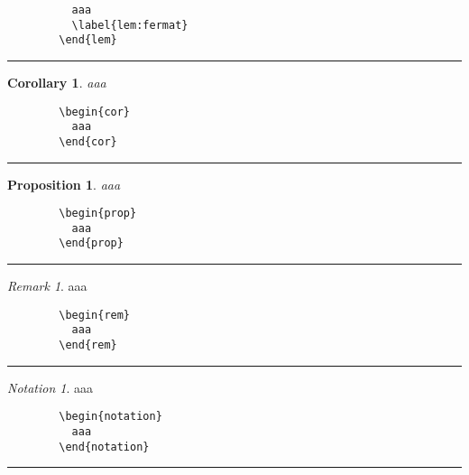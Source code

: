 \documentclass[a4paper,10pt,landscape]{article}
\makeatletter
\newcommand{\hSep}{{\color{colorSep}\hrule}}
\newtheorem{cor}[thm]{Corollary}
\newtheorem{prop}[thm]{Proposition}
\theoremstyle{definition}
\theoremstyle{remark}
\newtheorem{rem}{Remark}[section]
\newtheorem*{notation}{Notation}
\newtheorem{exmp}{Example}[section] %
\makeatother
\begin{document}
\begin{multicols}{3}
\begin{multicols}{2}
\begin{verbatim}
		  aaa
		  \label{lem:fermat}
		\end{lem}
	\end{verbatim}
\end{multicols}
\hSep
\begin{multicols}{2}
		\begin{cor}
		  aaa
		\end{cor}
\columnbreak
	\begin{verbatim}
		\begin{cor}
		  aaa
		\end{cor}
	\end{verbatim}
\end{multicols}
\hSep
\begin{multicols}{2}
		\begin{prop}
		  aaa
		\end{prop}
\columnbreak
	\begin{verbatim}
		\begin{prop}
		  aaa
		\end{prop}
	\end{verbatim}
\end{multicols}
\hSep
\begin{multicols}{2}
		\begin{rem}
		  aaa
		\end{rem}
\columnbreak
	\begin{verbatim}
		\begin{rem}
		  aaa
		\end{rem}
	\end{verbatim}
\end{multicols}
\hSep
\begin{multicols}{2}
		\begin{notation}
		  aaa
		\end{notation}
\columnbreak
	\begin{verbatim}
		\begin{notation}
		  aaa
		\end{notation}
	\end{verbatim}
\end{multicols}
\hSep






\end{multicols}
\end{document}
